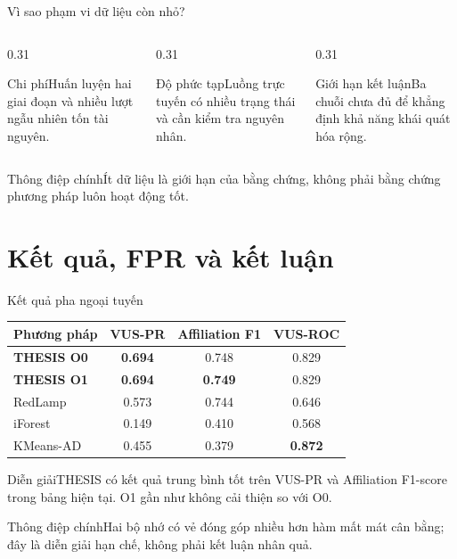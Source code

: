 \documentclass[aspectratio=169]{beamer}
\newcommand{\takeaway}[1]{\begin{alertblock}{Thông điệp chính}#1\end{alertblock}}
\begin{document}
\begin{frame}{Vì sao phạm vi dữ liệu còn nhỏ?}
  \begin{columns}[T,onlytextwidth]
    \begin{column}{0.31\textwidth}\begin{alertblock}{Chi phí}\centering Huấn luyện hai giai đoạn và nhiều lượt ngẫu nhiên tốn tài nguyên.\end{alertblock}\end{column}
    \begin{column}{0.31\textwidth}\begin{alertblock}{Độ phức tạp}\centering Luồng trực tuyến có nhiều trạng thái và cần kiểm tra nguyên nhân.\end{alertblock}\end{column}
    \begin{column}{0.31\textwidth}\begin{alertblock}{Giới hạn kết luận}\centering Ba chuỗi chưa đủ để khẳng định khả năng khái quát hóa rộng.\end{alertblock}\end{column}
  \end{columns}
  \takeaway{Ít dữ liệu là giới hạn của bằng chứng, không phải bằng chứng phương pháp luôn hoạt động tốt.}
\end{frame}

\section{Kết quả, FPR và kết luận}

\begin{frame}{Kết quả pha ngoại tuyến}
  \scriptsize
  \begin{tabular}{lccc}
    \toprule
    Phương pháp & VUS-PR & Affiliation F1 & VUS-ROC \\
    \midrule
    \textbf{THESIS O0} & \textbf{0.694} & 0.748 & 0.829 \\
    \textbf{THESIS O1} & \textbf{0.694} & \textbf{0.749} & 0.829 \\
    RedLamp & 0.573 & 0.744 & 0.646 \\
    iForest & 0.149 & 0.410 & 0.568 \\
    KMeans-AD & 0.455 & 0.379 & \textbf{0.872} \\
    \bottomrule
  \end{tabular}
  \begin{exampleblock}{Diễn giải}THESIS có kết quả trung bình tốt trên VUS-PR và Affiliation F1-score trong bảng hiện tại. O1 gần như không cải thiện so với O0.\end{exampleblock}
  \takeaway{Hai bộ nhớ có vẻ đóng góp nhiều hơn hàm mất mát cân bằng; đây là diễn giải hạn chế, không phải kết luận nhân quả.}
\end{frame}
\end{document}
